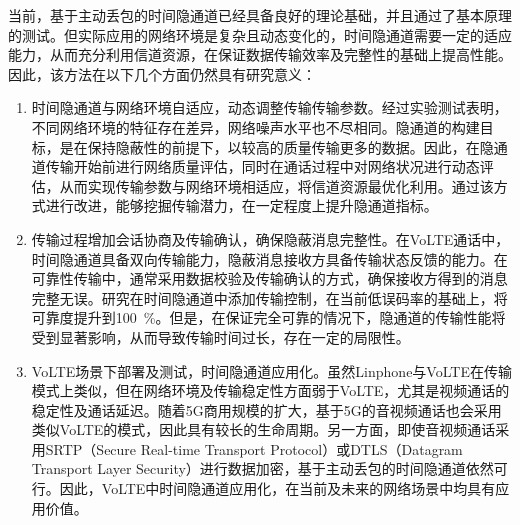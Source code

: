 \begin{conclusion}
当前，基于主动丢包的时间隐通道已经具备良好的理论基础，并且通过了基本原理的测试。但实际应用的网络环境是复杂且动态变化的，时间隐通道需要一定的适应能力，从而充分利用信道资源，在保证数据传输效率及完整性的基础上提高性能。因此，该方法在以下几个方面仍然具有研究意义：
\begin{enumerate}
    \item
    时间隐通道与网络环境自适应，动态调整传输传输参数。经过实验测试表明，不同网络环境的特征存在差异，网络噪声水平也不尽相同。隐通道的构建目标，是在保持隐蔽性的前提下，以较高的质量传输更多的数据。因此，在隐通道传输开始前进行网络质量评估，同时在通话过程中对网络状况进行动态评估，从而实现传输参数与网络环境相适应，将信道资源最优化利用。通过该方式进行改进，能够挖掘传输潜力，在一定程度上提升隐通道指标。
    
    \item
    传输过程增加会话协商及传输确认，确保隐蔽消息完整性。在VoLTE通话中，时间隐通道具备双向传输能力，隐蔽消息接收方具备传输状态反馈的能力。在可靠性传输中，通常采用数据校验及传输确认的方式，确保接收方得到的消息完整无误。研究在时间隐通道中添加传输控制，在当前低误码率的基础上，将可靠度提升到100\ \%。但是，在保证完全可靠的情况下，隐通道的传输性能将受到显著影响，从而导致传输时间过长，存在一定的局限性。
    
    \item
    VoLTE场景下部署及测试，时间隐通道应用化。虽然Linphone与VoLTE在传输模式上类似，但在网络环境及传输稳定性方面弱于VoLTE，尤其是视频通话的稳定性及通话延迟。随着5G商用规模的扩大，基于5G的音视频通话也会采用类似VoLTE的模式，因此具有较长的生命周期。另一方面，即使音视频通话采用SRTP（Secure Real-time Transport Protocol）或DTLS（Datagram Transport Layer Security）进行数据加密，基于主动丢包的时间隐通道依然可行。因此，VoLTE中时间隐通道应用化，在当前及未来的网络场景中均具有应用价值。

\end{enumerate}

\end{conclusion}